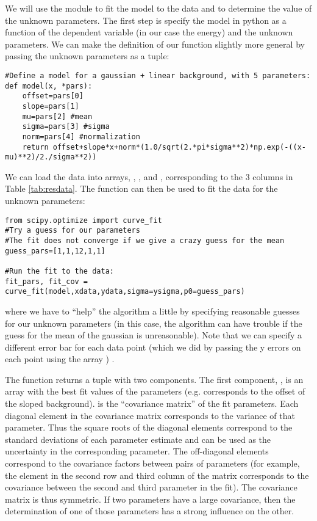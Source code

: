 We will use the  module to fit the model to the data and to determine the value of the unknown parameters. The first step is specify the model in python as a function of the dependent variable (in our case the energy) and the unknown parameters. We can make the definition of our function slightly more general by passing the unknown parameters as a tuple:
\begin{lstlisting}[frame=single] 
#Define a model for a gaussian + linear background, with 5 parameters:
def model(x, *pars):
    offset=pars[0]
    slope=pars[1]
    mu=pars[2] #mean
    sigma=pars[3] #sigma
    norm=pars[4] #normalization
    return offset+slope*x+norm*(1.0/sqrt(2.*pi*sigma**2)*np.exp(-((x-mu)**2)/2./sigma**2))
\end{lstlisting}
We can load the data into arrays, , , and , corresponding to the 3 columns in Table \ref{tab:resdata}. The  function can then be used to fit the data for the unknown parameters:
\begin{lstlisting}[frame=single] 
from scipy.optimize import curve_fit 
#Try a guess for our parameters
#The fit does not converge if we give a crazy guess for the mean
guess_pars=[1,1,12,1,1]

#Run the fit to the data:
fit_pars, fit_cov = curve_fit(model,xdata,ydata,sigma=ysigma,p0=guess_pars)
\end{lstlisting}
where we have to ``help'' the algorithm a little by specifying reasonable guesses for our unknown parameters (in this case, the algorithm can have trouble if the guess for the mean of the gaussian is unreasonable). Note that we can specify a different error bar for each data point (which we did by passing the y errors on each point using the array ) . 

The  function returns a tuple with two components. The first component, , is an array with the best fit values of the parameters (e.g.  corresponds to the offset of the sloped background).  is the ``covariance matrix'' of the fit parameters. Each diagonal element in the covariance matrix corresponds to the variance of that parameter. Thus the square roots of the diagonal elements correspond to the standard deviations of each parameter estimate and can be used as the uncertainty in the corresponding parameter. The off-diagonal elements correspond to the covariance factors between pairs of parameters (for example, the element in the second row and third column of the matrix corresponds to the covariance between the second and third parameter in the fit). The covariance matrix is thus symmetric. If two parameters have a large covariance, then the determination of one of those parameters has a strong influence on the other. 

